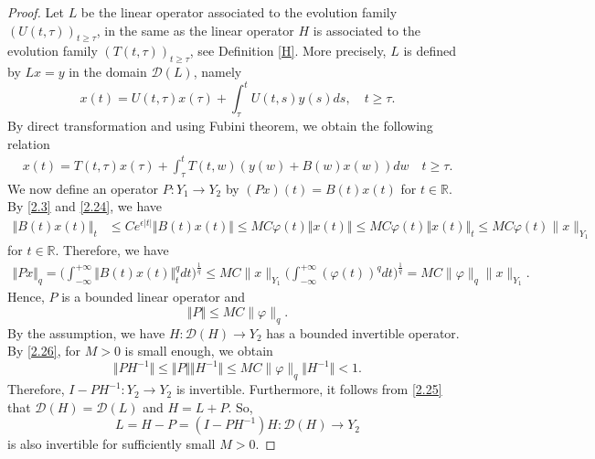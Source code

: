 \documentclass[reqno]{amsart}
\begin{document}
\begin{proof}
Let $L$ be the linear operator associated to the evolution family  $(U(t,\tau))_{t \geq \tau}$, in the same as the linear operator $H$ is associated to the evolution family  $(T(t,\tau))_{t\geq \tau}$, see Definition \ref{H}. More precisely, $L$ is defined by $Lx=y$ in the domain $\mathcal{D}(L)$, namely
$$x(t)=U(t,\tau)x(\tau)+ \displaystyle \int_{\tau}^t U(t,s)y(s)ds,\quad  t \geq \tau.$$
By direct transformation and using Fubini theorem, we obtain the following relation
\begin{align}
x(t)=T(t,\tau)x(\tau)+\displaystyle \int_{\tau}^t T(t,w) \left( y(w)+B(w)x(w) \right) dw \quad  t \geq \tau. \label{2.25}
\end{align}
We now define an operator $P: Y_1 \to Y_2$ by $(Px)(t)=B(t)x(t)$ for $t \in\mathbb{R}$. By \eqref{2.3} and \eqref{2.24}, we have
\begin{align*}
\Vert B(t)x(t) \Vert _t &\leq Ce^{\epsilon\vert t \vert} \Vert B(t)x(t) \Vert 
\leq MC \varphi(t) \Vert x(t) \Vert 
\leq MC \varphi(t) \Vert x(t) \Vert  _t \le MC \varphi(t) \|x\|_{Y_1}
\end{align*}
for $t \in \mathbb{R}$. Therefore, we have
\begin{align*}
\Vert Px\Vert _q=\Big(\int_{-\infty}^{+\infty} \Vert B(t)x(t) \Vert _t^q dt\Big)^{\frac{1}{q}} \leq MC \|x\|_{Y_1} \Big( \int_{-\infty}^{+\infty} (\varphi(t))^q dt \Big)^{\frac{1}{q}} = MC \|\varphi\|_q \|x\|_{Y_1}.
\end{align*}
Hence, $P$ is a bounded linear operator and 
\begin{equation}
\Vert P\Vert  \leq MC \|\varphi\|_q. \label{2.26}
\end{equation}
By the assumption, we have $H:\mathcal{D}(H) \rightarrow Y_2 $ has a bounded invertible operator.
By \eqref{2.26}, for $M>0$ is small enough, we obtain
$$\Vert PH^{-1} \Vert \leq \Vert P\Vert \Vert H^{-1} \Vert \leq MC  \|\varphi\|_q \Vert H^{-1} \Vert <1.$$
Therefore, $I-PH^{-1}: Y_2 \to Y_2$ is invertible. 
Furthermore, it follows from \eqref{2.25} that $\mathcal{D}(H)=\mathcal{D}(L)$ and $H=L+P$. So,
$$ L=H-P=(I-PH^{-1})H: \mathcal{D}(H) \rightarrow Y_2$$
is also invertible for sufficiently small $M>0$.


\end{proof}
\end{document}
